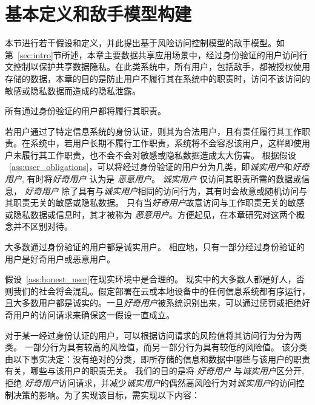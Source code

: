 \section{基本定义和敌手模型构建}
\label{sec:adversary_model}

本节进行若干假设和定义，并此提出基于风险访问控制模型的敌手模型。如第~\ref{sec:intro}节所述，本章主要数据共享应用场景中，经过身份验证的用户访问行文控制以保护共享数据隐私。在此类系统中，所有用户，包括敌手，都被授权使用存储的数据，本章的目的是防止用户不履行其在系统中的职责时，访问不该访问的敏感或隐私数据而造成的隐私泄露。

\begin{assumption}
	\label{ass:user_obligations}
	所有通过身份验证的用户都将履行其职责。
\end{assumption}

若用户通过了特定信息系统的身份认证，则其为合法用户，且有责任履行其工作职责。在系统中，若用户长期不履行工作职责，系统将不会容忍该用户，这样即使用户未履行其工作职责，也不会不会对敏感或隐私数据造成太大伤害。 根据假设 ~\ref{ass:user_obligations}，可以将经过身份验证的用户分为几类，即\emph{诚实用户}和\emph{好奇用户}, 有时将\emph{好奇用户} 认为是 \emph{恶意用户}。 \emph{诚实用户} 仅访问其职责所需的数据或信息，  \emph{好奇用户} 除了具有与\emph{诚实用户}相同的访问行为，其有时会故意或随机访问与其职责无关的敏感或隐私数据。 只有当\emph{好奇用户}故意访问与工作职责无关的敏感或隐私数据或信息时，其才被称为 \emph{恶意用户}。方便起见，在本章研究对这两个概念并不区别对待。

\begin{assumption}
	\label{ass:honest_user}
	大多数通过身份验证的用户都是诚实用户。 相应地，只有一部分经过身份验证的用户是好奇用户或恶意用户。
\end{assumption}

假设~\ref{ass:honest_user}在现实环境中是合理的。 现实中的大多数人都是好人，否则我们的社会将会混乱。假定部署在云或本地设备中的任何信息系统都有序运行，且大多数用户都是诚实的。一旦\emph{好奇用户}被系统识别出来，可以通过惩罚或拒绝好奇用户的访问请求来确保这一假设一直成立。

对于某一经过身份认证的用户，可以根据访问请求的风险值将其访问行为分为两类。 一部分行为具有较高的风险值，而另一部分行为具有较低的风险值。 该分类由以下事实决定：没有绝对的分类，即所存储的信息和数据中哪些与该用户的职责有关，哪些与该用户的职责无关。 我们的目的是将 \emph{好奇用户} 与\emph{诚实用户}区分开, 拒绝 \emph{好奇用户}访问请求，并减少\emph{诚实用户}的偶然高风险行为对\emph{诚实用户}的访问控制决策的影响。为了实现该目标，需实现以下内容：

